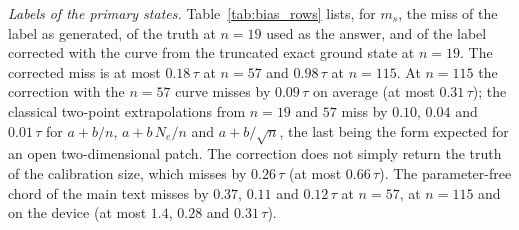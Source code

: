 \documentclass[aps,prx,onecolumn,10pt,nofootinbib,longbibliography,floatfix]{revtex4-2}
\theoremstyle{remark}
\newcommand{\ms}{m_s}
\begin{document}
\emph{Labels of the primary states.} Table~\ref{tab:bias_rows} lists, for $\ms$, the miss of the label as generated, of
the truth at $n=19$ used as the answer, and of the label corrected with the curve from the truncated exact ground state %
at $n=19$. The corrected miss is at most $0.18\,\tau$ at $n=57$ and $0.98\,\tau$ at $n=115$. At $n=115$ the %
correction with the $n=57$ curve misses by $0.09\,\tau$ on average (at most $0.31\,\tau$); the %
classical two-point extrapolations from $n=19$ and $57$ miss by $0.10$, $0.04$ and $0.01\,\tau$ for $a+b/n$, $a+b\,N_e/n$ %
and $a+b/\sqrt n$, the last being the form expected for an open two-dimensional patch. The correction does not
simply return the truth of the calibration size, which misses by $0.26\,\tau$ (at most $0.66\,\tau$). The %
parameter-free chord of the main text misses by $0.37$, $0.11$ and $0.12\,\tau$ at $n=57$, at %
$n=115$ and on the device (at most $1.4$, $0.28$ and $0.31\,\tau$). %
\def\SMcap{Exploratory correction of $\ms$ with the curve from exact $n=19$: miss in units of $\tau$, primary emulated labels.}\def\SMlab{tab:bias_rows}

\end{document}
